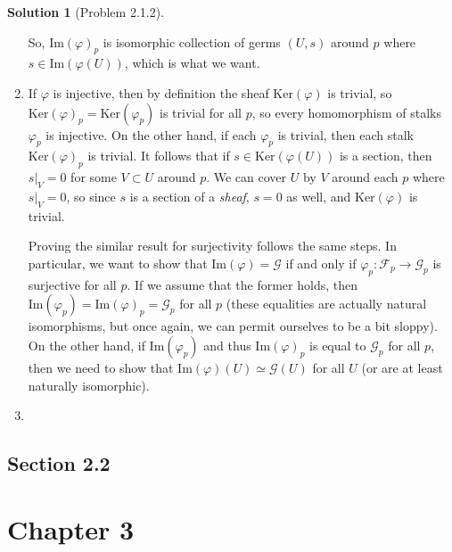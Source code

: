 \documentclass[aps,pra,showpacs,notitlepage,onecolumn,superscriptaddress,nofootinbib]{revtex4-1}
\theoremstyle{definition}
\newtheorem{solution}{Solution}[section]
\begin{document}
\begin{solution}[Problem 2.1.2]
\begin{enumerate}
      So, $\text{Im}(\varphi)_p$ is isomorphic collection of germs $(U, s)$ around $p$ where $s \in \text{Im}(\varphi(U))$, which is what we want.
      \item If $\varphi$ is injective, then by definition the sheaf $\text{Ker}(\varphi)$ is trivial, so $\text{Ker}(\varphi)_p = \text{Ker}(\varphi_p)$ is trivial for all $p$, so every homomorphism of
        stalks $\varphi_p$ is injective. On the other hand, if each $\varphi_p$ is trivial, then each stalk $\text{Ker}(\varphi)_p$ is trivial. It follows that if $s \in \text{Ker}(\varphi(U))$ is a section,
        then $s|_V = 0$ for some $V \subset U$ around $p$. We can cover $U$ by $V$ around each $p$ where $s|_V = 0$, so since $s$ is a section of a \emph{sheaf}, $s = 0$
        as well, and $\text{Ker}(\varphi)$ is trivial.

        Proving the similar result for surjectivity follows the same steps. In particular, we want to show that $\text{Im}(\varphi) = \mathcal{G}$ if and only if $\varphi_p : \mathcal{F}_p \rightarrow \mathcal{G}_p$ is surjective
        for all $p$. If we assume that the former holds, then $\text{Im}(\varphi_p) = \text{Im}(\varphi)_p = \mathcal{G}_p$ for all $p$ (these equalities are actually natural isomorphisms, but once again, we can
        permit ourselves to be a bit sloppy). On the other hand, if $\text{Im}(\varphi_p)$ and thus $\text{Im}(\varphi)_p$ is equal to $\mathcal{G}_p$ for all $p$, then we need to show that $\text{Im}(\varphi)(U) \simeq \mathcal{G}(U)$
        for all $U$ (or are at least naturally isomorphic). 
      \item 
    \end{enumerate}
  \end{solution}

\subsection{Section 2.2}



\section{Chapter 3}
\end{document}
